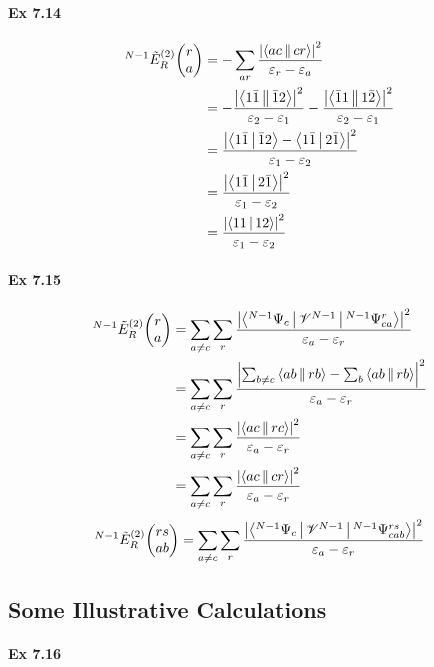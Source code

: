 \documentclass[a4paper]{article}
\newcommand{\ex}[1]{\paragraph{Ex #1}}
\numberwithin{equation}{subsection}
\begin{document}
\ex{7.14}
\begin{align}
{^{N-1}}\tilde{E}_R^{(2)}\mqty(r\\ a) &= -\sum_{ar}\dfrac{\abs{\Braket{ac||cr}}^2}{\varepsilon_r - \varepsilon_a} \notag\\
&= -\dfrac{\abs{\Braket{1\bar{1}||\bar{1}2}}^2}{\varepsilon_2 - \varepsilon_1} - \dfrac{\abs{\Braket{\bar{1} 1||1\bar{2}}}^2}{\varepsilon_2 - \varepsilon_1} \notag\\
&= \dfrac{\abs{\Braket{1\bar{1}|\bar{1}2} - \Braket{1\bar{1}|2\bar{1}}}^2}{\varepsilon_1 - \varepsilon_2} \notag\\
&= \dfrac{\abs{\Braket{1\bar{1}|2\bar{1}}}^2}{\varepsilon_1 - \varepsilon_2} \notag\\
&= \dfrac{\abs{\Braket{11|12}}^2}{\varepsilon_1 - \varepsilon_2} 
\end{align}

\ex{7.15}
\begin{align}
{^{N-1}}\tilde{E}_R^{(2)}\mqty(r\\ a) 
&= \sum_{a\neq c}\sum_r \dfrac{\abs{
		\Braket{^{N-1}\Psi_c | \mathscr{V}^{N-1} | ^{N-1}\Psi_{ca}^r} 
	}^2	}{\varepsilon_a - \varepsilon_r} \notag\\
&= \sum_{a\neq c}\sum_r \dfrac{\abs{
		\sum_{b\neq c} \Braket{ab||rb} - \sum_b \Braket{ab||rb}
	}^2	}{\varepsilon_a - \varepsilon_r} \notag\\
&= \sum_{a\neq c}\sum_r \dfrac{\abs{\Braket{ac||rc}	}^2	}{\varepsilon_a - \varepsilon_r} \notag\\
&= \sum_{a\neq c}\sum_r \dfrac{\abs{\Braket{ac||cr}	}^2	}{\varepsilon_a - \varepsilon_r}
\end{align}
\begin{align}
{^{N-1}}\tilde{E}_R^{(2)}\mqty(rs\\ ab) 
&= \sum_{a\neq c}\sum_r \dfrac{\abs{
		\Braket{^{N-1}\Psi_c | \mathscr{V}^{N-1} | ^{N-1}\Psi_{cab}^{rs}} 
	}^2	}{\varepsilon_a - \varepsilon_r} \notag\\
\end{align}

\subsection{Some Illustrative Calculations}
\ex{7.16}
\end{document}
